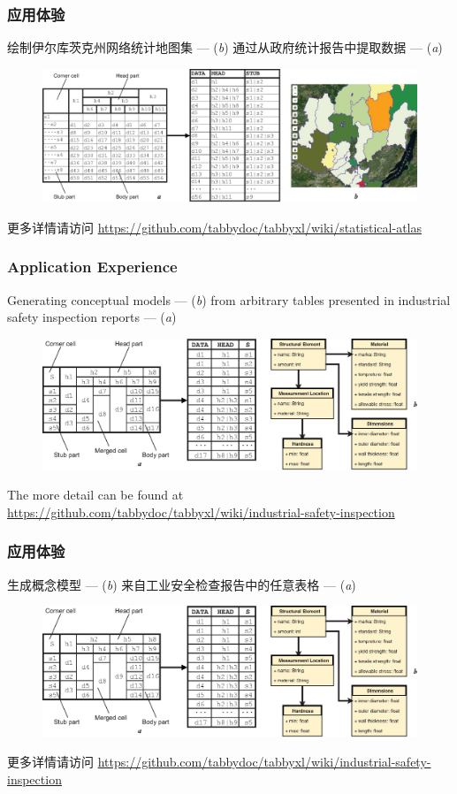 \documentclass[10pt]{beamer}
\begin{document}
\begin{frame}
\frametitle{应用体验}
绘制伊尔库茨克州网络统计地图集 --- (\textit{b}) 通过从政府统计报告中提取数据 --- (\textit{a})
\begin{figure}
\includegraphics[width=1\linewidth]{application1}
\end{figure}
\tiny{更多详情请访问 \url{https://github.com/tabbydoc/tabbyxl/wiki/statistical-atlas}}
\end{frame}

\begin{frame}
\frametitle{Application Experience}
Generating conceptual models --- (\textit{b}) from arbitrary tables presented in industrial safety inspection reports --- (\textit{a})
\begin{figure}
\includegraphics[width=1\linewidth]{application2}
\end{figure}
\tiny{The more detail can be found at \url{https://github.com/tabbydoc/tabbyxl/wiki/industrial-safety-inspection}}
\end{frame}

\begin{frame}
\frametitle{应用体验}
生成概念模型 --- (\textit{b}) 来自工业安全检查报告中的任意表格 --- (\textit{a})
\begin{figure}
\includegraphics[width=1\linewidth]{application2}
\end{figure}
\tiny{更多详情请访问 \url{https://github.com/tabbydoc/tabbyxl/wiki/industrial-safety-inspection}}
\end{frame}
\end{document}
